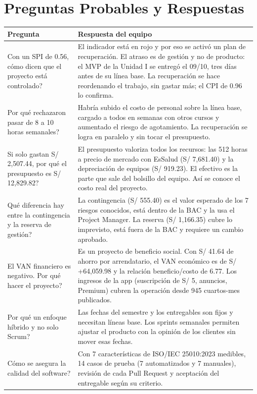 \documentclass[11pt,a4paper]{article}
\begin{document}
\section{Preguntas Probables y Respuestas}
{\small
{}
\noindent\begin{tabularx}{\textwidth}{@{}P{5.1cm} L@{}}
\toprule
{}
\textbf{Pregunta} & \textbf{Respuesta del equipo} \\
\midrule
Con un SPI de 0.56, cómo dicen que el proyecto está controlado? & El indicador está en rojo y por eso se activó un plan de recuperación. El atraso es de gestión y no de producto: el MVP de la Unidad I se entregó el 09/10, tres días antes de su línea base. La recuperación se hace reordenando el trabajo, sin gastar más; el CPI de 0.96 lo confirma. \\
Por qué rechazaron pasar de 8 a 10 horas semanales? & Habría subido el costo de personal sobre la línea base, cargado a todos en semanas con otros cursos y aumentado el riesgo de agotamiento. La recuperación se logra en paralelo y sin tocar el presupuesto. \\
Si solo gastan S/ 2,507.44, por qué el presupuesto es S/ 12,829.82? & El presupuesto valoriza todos los recursos: las 512 horas a precio de mercado con EsSalud (S/ 7,681.40) y la depreciación de equipos (S/ 919.23). El efectivo es la parte que sale del bolsillo del equipo. Así se conoce el costo real del proyecto. \\
Qué diferencia hay entre la contingencia y la reserva de gestión? & La contingencia (S/ 555.40) es el valor esperado de los 7 riesgos conocidos, está dentro de la BAC y la usa el Project Manager. La reserva (S/ 1,166.35) cubre lo imprevisto, está fuera de la BAC y requiere un cambio aprobado. \\
El VAN financiero es negativo. Por qué hacer el proyecto? & Es un proyecto de beneficio social. Con S/ 41.64 de ahorro por arrendatario, el VAN económico es de S/ +64,059.98 y la relación beneficio/costo de 6.77. Los ingresos de la app (suscripción de S/ 5, anuncios, Premium) cubren la operación desde 945 cuartos-mes publicados. \\
Por qué un enfoque híbrido y no solo Scrum? & Las fechas del semestre y los entregables son fijos y necesitan líneas base. Los sprints semanales permiten ajustar el producto con la opinión de los clientes sin mover esas fechas. \\
Cómo se asegura la calidad del software? & Con 7 características de ISO/IEC 25010:2023 medibles, 14 casos de prueba (7 automatizados y 7 manuales), revisión de cada Pull Request y aceptación del entregable según su criterio. \\

\end{tabularx}}
\end{document}
